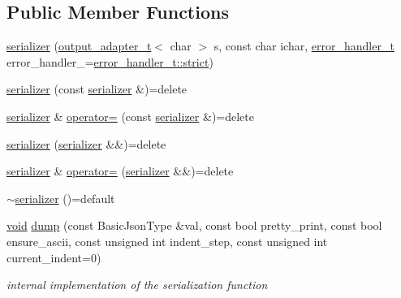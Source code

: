 \subsection*{Public Member Functions}
\begin{DoxyCompactItemize}
\item 
\hyperlink{classnlohmann_1_1detail_1_1serializer_ac010525281d97867ee842da37294fe83}{serializer} (\hyperlink{namespacenlohmann_1_1detail_a0fd8edff7729aa2dd92b070964bade2e}{output\+\_\+adapter\+\_\+t}$<$ char $>$ s, const char ichar, \hyperlink{namespacenlohmann_1_1detail_a5a76b60b26dc8c47256a996d18d967df}{error\+\_\+handler\+\_\+t} error\+\_\+handler\+\_\+=\hyperlink{namespacenlohmann_1_1detail_a5a76b60b26dc8c47256a996d18d967dfa2133fd717402a7966ee88d06f9e0b792}{error\+\_\+handler\+\_\+t\+::strict})
\item 
\hyperlink{classnlohmann_1_1detail_1_1serializer_ae3771351ec4cb892bec707edeb56dc31}{serializer} (const \hyperlink{classnlohmann_1_1detail_1_1serializer}{serializer} \&)=delete
\item 
\hyperlink{classnlohmann_1_1detail_1_1serializer}{serializer} \& \hyperlink{classnlohmann_1_1detail_1_1serializer_a5f14c33012477b9f9876dc54d97009a0}{operator=} (const \hyperlink{classnlohmann_1_1detail_1_1serializer}{serializer} \&)=delete
\item 
\hyperlink{classnlohmann_1_1detail_1_1serializer_a28081304e70cca6b3042c101ee5c498c}{serializer} (\hyperlink{classnlohmann_1_1detail_1_1serializer}{serializer} \&\&)=delete
\item 
\hyperlink{classnlohmann_1_1detail_1_1serializer}{serializer} \& \hyperlink{classnlohmann_1_1detail_1_1serializer_acaafe3436ee5fb74777eb4132a88c513}{operator=} (\hyperlink{classnlohmann_1_1detail_1_1serializer}{serializer} \&\&)=delete
\item 
\hyperlink{classnlohmann_1_1detail_1_1serializer_aa6c62b51cbebb185307df851dc0167f0}{$\sim$serializer} ()=default
\item 
\hyperlink{namespacenlohmann_1_1detail_a59fca69799f6b9e366710cb9043aa77d}{void} \hyperlink{classnlohmann_1_1detail_1_1serializer_a95460ebd1a535a543e5a0ec52e00f48b}{dump} (const Basic\+Json\+Type \&val, const bool pretty\+\_\+print, const bool ensure\+\_\+ascii, const unsigned int indent\+\_\+step, const unsigned int current\+\_\+indent=0)
\begin{DoxyCompactList}\small\item\em internal implementation of the serialization function \end{DoxyCompactList}\end{DoxyCompactItemize}
